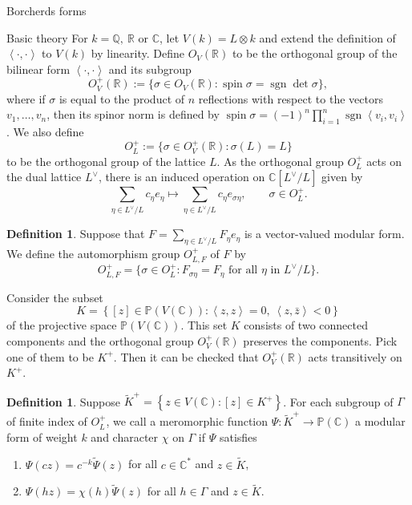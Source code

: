 \documentclass{amsart}
\newcounter{lemma}
\theoremstyle{definition}
\newtheorem{Definition}[lemma]{Definition}
\def\C{\mathbb C}
\def\Q{\mathbb Q}
\def\R{\mathbb R}
\def\sgn{\operatorname{sgn}}
\def\spin{\operatorname{spin}}
\begin{document}
\begin{section}{Borcherds forms}
\begin{subsection}{Basic theory}
For $k=\Q,\ \R$ or $\C$, let $V(k)=L\otimes k$ and extend the
definition of $\left\langle \cdot,\cdot \right\rangle$ to $V(k)$ by
linearity. Define $O_V(\R)$ to be the orthogonal group of the bilinear
form $\left\langle \cdot,\cdot \right\rangle$ and its subgroup
$$O^+_V(\R):=\{\sigma\in O_V(\R):\spin\sigma= \sgn\det\sigma \}, $$
where if $\sigma$ is equal to the product of $n$ reflections with
respect to the vectors $v_1,\ldots,v_n$, then its spinor norm is
defined by $\spin\sigma=(-1)^n\prod^n_{i=1}\sgn\left\langle v_i,v_i
\right\rangle$. We also define
$$
  O^+_L:=\{\sigma\in O^+_V(\R): \sigma(L)= L \}
$$
to be the orthogonal group of the lattice $L$. As the
orthogonal group $O^+_L$ acts on the dual lattice $L^{\vee}$, there is
an induced operation on $\C[L^{\vee}/L]$ given by
$$
  \sum_{\eta\in L^{\vee}/L}c_{\eta}e_{\eta}\longmapsto\sum_{\eta\in
  L^{\vee}/L}c_{\eta}e_{\sigma\eta}, \qquad \sigma\in O^+_L.
$$

\begin{Definition}
Suppose that $F=\sum_{\eta\in L^{\vee}/L}F_\eta e_\eta$ is a vector-valued
modular form. We define the {automorphism group} $O^+_{L,F}$ of $F$ by
\begin{equation*}
O^+_{L,F}=\{\sigma \in O^+_L:F_{\sigma\eta}=F_{\eta}
  \text{ for all }\eta \text{ in } L^{\vee}/L\}.
\end{equation*}

\end{Definition}

Consider the subset
$$
  K=\left\{ \left[ z\right] \in \mathbb{P}\left( V\left( \mathbb{C}
  \right) \right) :\left\langle z,z \right\rangle =0,
  \ \left\langle z,\bar{z} \right\rangle <0\right\}
$$
of the projective space $\mathbb{P}(V(\C))$. This set $K$ consists of
two connected components and the orthogonal group $O^+_V(\R)$
preserves the components. Pick one of them to be $K^+$. Then it can be
checked that $O^+_V(\R)$ acts transitively on $K^+$.

\begin{Definition}
Suppose $\widetilde{K}^+=\left\{ z \in V\left( 
\mathbb{C}\right) :\left[ z\right] \in K^+ \right\}$.
For each subgroup of $\Gamma$ of finite index of $O^+_L$, we call a
meromorphic function $\Psi:\widetilde{K}^+\rightarrow \mathbb{P}(\C)$
a {modular form of weight} {$k$} and character $\chi$ on $\Gamma$
if $\Psi$ satisfies 
\begin{enumerate}
\item[(i)] ${\Psi}(cz)=c^{-k}\widetilde{\Psi}(z)$ for all $c\in
    {\C}^\ast$ and $z\in\widetilde{K}$,
\item[(ii)] ${\Psi}(hz)=\chi (h)\widetilde{\Psi}(z)$ for all $h\in \Gamma$
  and $z\in\widetilde{K}$.
\end{enumerate}
\end{Definition}


\end{subsection}
\end{section}
\end{document}

